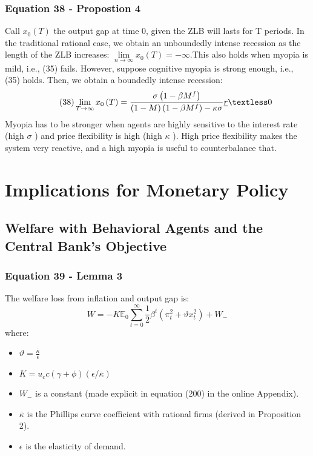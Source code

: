 \documentclass{article}
\begin{document}
\subsubsection*{Equation 38 - Propostion 4}
Call $x_{0}\left(T\right)$ the output gap at time 0, given the ZLB will lasts for T periods. In the traditional rational case, we obtain an unboundedly intense recession as the length of the ZLB increases: $\lim\limits_{n\to\infty}x_{0}\left(T\right)=-\infty$.This also holds when myopia is mild, i.e., (35) fails. However, suppose cognitive myopia is strong enough, i.e., (35) holds. Then, we obtain a boundedly intense recession:
\begin{equation}\tag{38}
    \lim\limits_{T\to\infty}x_{0}\left(T\right)=\frac{\sigma\left(1-\beta M^{f}\right)}{\left(1-M\right)\left(1-\beta M^{f}\right)-\kappa\sigma}\underline{r}\textless 0
\end{equation}
Myopia has to be stronger when agents are highly sensitive to the interest rate (high $\sigma$ ) and price flexibility is high (high $\kappa$ ). High price flexibility makes the system very reactive, and a high myopia is useful to counterbalance that.

\section{Implications for Monetary Policy}

\subsection{Welfare with Behavioral Agents and the Central Bank’s Objective}

\subsubsection*{Equation 39 - Lemma 3}
The welfare loss from inflation and output gap is:
\begin{equation}\tag{39}
    W=-K\mathbb{E}_{0}\sum_{t=0}^{\infty}\frac{1}{2}\beta^{t}\left(\pi_{t}^{2}+\vartheta x_{t}^{2}\right)+W_{-}
\end{equation}
where:
\begin{itemize}
    \item $\vartheta=\frac{\overline{\kappa}}{\epsilon}$
    \item $K=u_{c}c\left(\gamma+\phi\right)\left(\epsilon/\overline{\kappa}\right)$
    \item $W_{-}$ is a constant (made explicit in
equation (200) in the online Appendix).
    \item $\overline{\kappa}$ is the Phillips curve coefficient with rational firms (derived in Proposition 2).
    \item $\epsilon$ is the elasticity of demand.
\end{itemize}
\end{document}

